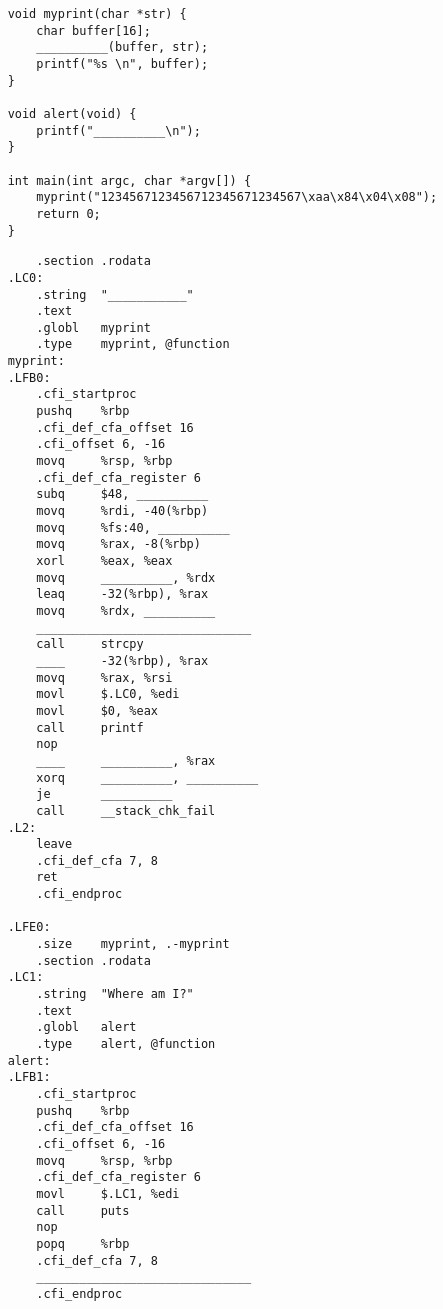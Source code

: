 \begin{problems}
\begin{verbatim}
    void myprint(char *str) {
        char buffer[16];
        __________(buffer, str);
        printf("%s \n", buffer);
    }

    void alert(void) {
        printf("__________\n");
    }

    int main(int argc, char *argv[]) {
        myprint("1234567123456712345671234567\xaa\x84\x04\x08");
        return 0;
    }
        \end{verbatim}
        \begin{verbatim}
        .section .rodata
    .LC0:
        .string  "___________"
        .text
        .globl   myprint
        .type    myprint, @function
    myprint:
    .LFB0:
        .cfi_startproc
        pushq    %rbp
        .cfi_def_cfa_offset 16
        .cfi_offset 6, -16
        movq     %rsp, %rbp
        .cfi_def_cfa_register 6
        subq     $48, __________
        movq     %rdi, -40(%rbp)
        movq     %fs:40, __________
        movq     %rax, -8(%rbp)
        xorl     %eax, %eax
        movq     __________, %rdx
        leaq     -32(%rbp), %rax
        movq     %rdx, __________
        ______________________________
        call     strcpy
        ____     -32(%rbp), %rax
        movq     %rax, %rsi
        movl     $.LC0, %edi
        movl     $0, %eax
        call     printf
        nop
        ____     __________, %rax
        xorq     __________, __________
        je       __________
        call     __stack_chk_fail
    .L2:
        leave
        .cfi_def_cfa 7, 8
        ret
        .cfi_endproc

    .LFE0:
        .size    myprint, .-myprint
        .section .rodata
    .LC1:
        .string  "Where am I?"
        .text
        .globl   alert
        .type    alert, @function
    alert:
    .LFB1:
        .cfi_startproc
        pushq    %rbp
        .cfi_def_cfa_offset 16
        .cfi_offset 6, -16
        movq     %rsp, %rbp
        .cfi_def_cfa_register 6
        movl     $.LC1, %edi
        call     puts
        nop
        popq     %rbp
        .cfi_def_cfa 7, 8
        ______________________________
        .cfi_endproc


\end{verbatim}
\end{problems}
